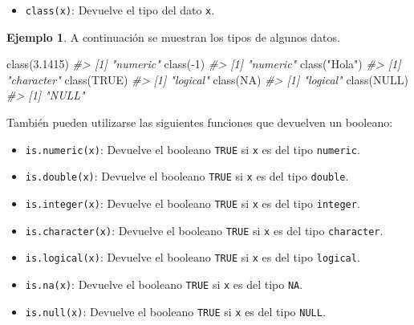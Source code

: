 \documentclass[
]{book}
\newenvironment{Shaded}{\begin{snugshade}}{\end{snugshade}}
\newcommand{\CommentTok}[1]{\textcolor[rgb]{0.56,0.35,0.01}{\textit{#1}}}
\newcommand{\ConstantTok}[1]{\textcolor[rgb]{0.00,0.00,0.00}{#1}}
\newcommand{\DecValTok}[1]{\textcolor[rgb]{0.00,0.00,0.81}{#1}}
\newcommand{\FloatTok}[1]{\textcolor[rgb]{0.00,0.00,0.81}{#1}}
\newcommand{\FunctionTok}[1]{\textcolor[rgb]{0.00,0.00,0.00}{#1}}
\newcommand{\NormalTok}[1]{#1}
\newcommand{\SpecialCharTok}[1]{\textcolor[rgb]{0.00,0.00,0.00}{#1}}
\newcommand{\StringTok}[1]{\textcolor[rgb]{0.31,0.60,0.02}{#1}}
\providecommand{\tightlist}{%
  \setlength{\itemsep}{0pt}\setlength{\parskip}{0pt}}
\theoremstyle{definition}
\theoremstyle{definition}
\newtheorem{example}{Ejemplo}[chapter]
\theoremstyle{definition}
\theoremstyle{definition}
\theoremstyle{remark}
\begin{document}
\begin{itemize}
\tightlist
\item
  \texttt{class(x)}: Devuelve el tipo del dato \texttt{x}.
\end{itemize}

\begin{example}

A continuación se muestran los tipos de algunos datos.

\begin{Shaded}
\begin{Highlighting}[]
\FunctionTok{class}\NormalTok{(}\FloatTok{3.1415}\NormalTok{)}
\CommentTok{\#\textgreater{} [1] "numeric"}
\FunctionTok{class}\NormalTok{(}\SpecialCharTok{{-}}\DecValTok{1}\NormalTok{)}
\CommentTok{\#\textgreater{} [1] "numeric"}
\FunctionTok{class}\NormalTok{(}\StringTok{"Hola"}\NormalTok{)}
\CommentTok{\#\textgreater{} [1] "character"}
\FunctionTok{class}\NormalTok{(}\ConstantTok{TRUE}\NormalTok{)}
\CommentTok{\#\textgreater{} [1] "logical"}
\FunctionTok{class}\NormalTok{(}\ConstantTok{NA}\NormalTok{)}
\CommentTok{\#\textgreater{} [1] "logical"}
\FunctionTok{class}\NormalTok{(}\ConstantTok{NULL}\NormalTok{)}
\CommentTok{\#\textgreater{} [1] "NULL"}
\end{Highlighting}
\end{Shaded}

\end{example}

También pueden utilizarse las siguientes funciones que devuelven un booleano:

\begin{itemize}
\tightlist
\item
  \texttt{is.numeric(x)}: Devuelve el booleano \texttt{TRUE} si \texttt{x} es del tipo \texttt{numeric}.
\item
  \texttt{is.double(x)}: Devuelve el booleano \texttt{TRUE} si \texttt{x} es del tipo \texttt{double}.
\item
  \texttt{is.integer(x)}: Devuelve el booleano \texttt{TRUE} si \texttt{x} es del tipo \texttt{integer}.
\item
  \texttt{is.character(x)}: Devuelve el booleano \texttt{TRUE} si \texttt{x} es del tipo \texttt{character}.
\item
  \texttt{is.logical(x)}: Devuelve el booleano \texttt{TRUE} si \texttt{x} es del tipo \texttt{logical}.
\item
  \texttt{is.na(x)}: Devuelve el booleano \texttt{TRUE} si \texttt{x} es del tipo \texttt{NA}.
\item
  \texttt{is.null(x)}: Devuelve el booleano \texttt{TRUE} si \texttt{x} es del tipo \texttt{NULL}.
\end{itemize}
\end{document}
